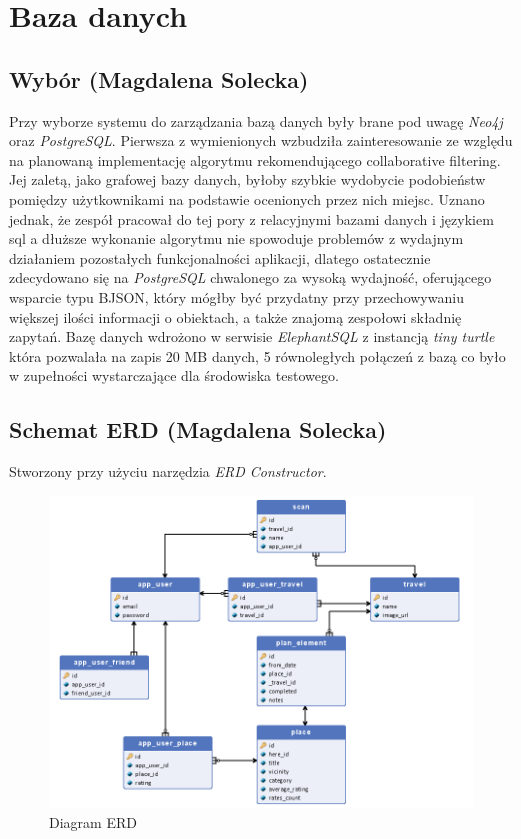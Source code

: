 \documentclass[10pt,twoside,a4paper]{report}
\begin{document}
\chapter{Baza danych}
\section{Wybór (Magdalena Solecka)}
\par Przy wyborze systemu do zarządzania bazą danych były brane pod uwagę \textit{Neo4j} oraz \textit{PostgreSQL}. Pierwsza z wymienionych wzbudziła zainteresowanie ze względu na planowaną implementację algorytmu rekomendującego collaborative filtering. Jej zaletą, jako grafowej bazy danych, byłoby szybkie wydobycie podobieństw pomiędzy użytkownikami na podstawie ocenionych przez nich miejsc. Uznano jednak, że zespół pracował do tej pory z relacyjnymi bazami danych i językiem sql a dłuższe wykonanie algorytmu nie spowoduje problemów z wydajnym działaniem pozostałych funkcjonalności aplikacji, dlatego ostatecznie zdecydowano się na \textit{PostgreSQL} chwalonego za wysoką wydajność, oferującego wsparcie typu BJSON, który mógłby być przydatny przy  przechowywaniu większej ilości informacji o obiektach, a także znajomą zespołowi składnię zapytań. Bazę danych wdrożono w serwisie \textit{ElephantSQL} z instancją \textit{tiny turtle}
 która pozwalała na zapis 20 MB danych, 5 równoległych połączeń z bazą co było w zupełności wystarczające dla środowiska testowego.

\section{Schemat ERD (Magdalena Solecka)}
\par Stworzony przy użyciu narzędzia \textit{ERD Constructor}.

\noindent\newline
\begin{figure}[h]
\centering
\includegraphics[width=\linewidth]{erd}
\caption{Diagram ERD}
\label{fig:erd}
\end{figure}
\FloatBarrier
\end{document}
